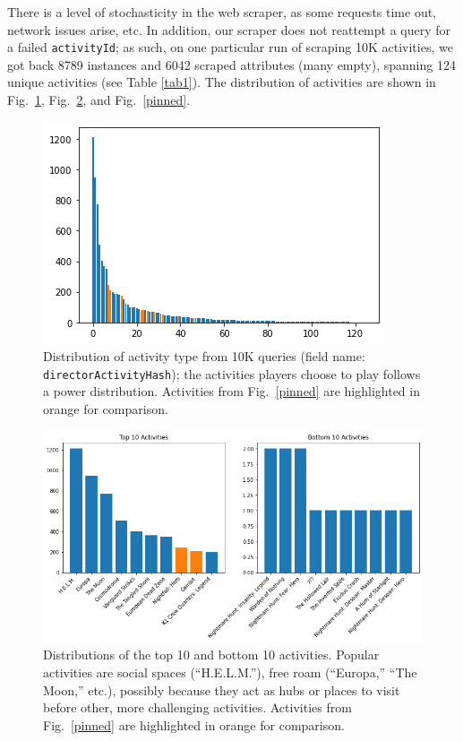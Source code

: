 \documentclass[conference]{IEEEtran}
\begin{document}
There is a level of stochasticity in the web scraper, as some requests time
out, network issues arise, etc. In addition, our scraper does not reattempt a
query for a failed \texttt{activityId}; as such, on one particular run of
scraping 10K activities, we got back 8789 instances and 6042 scraped attributes
(many empty), spanning 124 unique activities (see Table
\ref{tab1}). The distribution of activities are shown in
Fig.~\ref{power-dist}, Fig.~\ref{top-bot}, and
Fig.~\ref{pinned}.
%
\begin{figure}[htbp]
    \centerline{\includegraphics[width=0.75\columnwidth]{figs/activities-pwr-dist.png}}
    \caption{Distribution of activity type from 10K queries (field name:
        \texttt{directorActivityHash}); the
        activities players choose to play follows a power distribution. Activities from
        Fig.~\ref{pinned} are highlighted in orange for comparison.}
    \label{power-dist}
\end{figure}
%
\begin{figure}[htbp]
    \centerline{
        \includegraphics[width=0.95\columnwidth]{figs/top-10-and-bottom-10.png}
    }
    \caption{Distributions of the top 10 and bottom 10 activities. Popular activities are
        social spaces (``H.E.L.M.''), free roam (``Europa,'' ``The Moon,'' etc.),
        possibly because they act as hubs or places to visit before
        other, more challenging activities. Activities from
        Fig.~\ref{pinned} are highlighted in orange for comparison.}
    \label{top-bot}
\end{figure}
\end{document}
